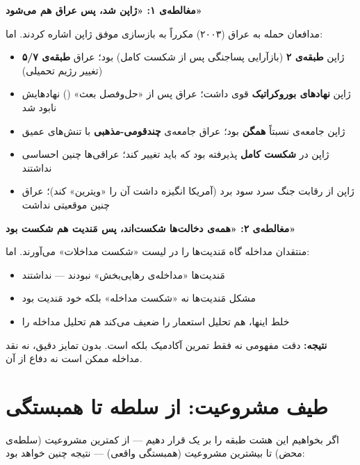 \begin{tcolorbox}[enemybox, title={خطر خلط طبقه‌ها: دو مغالطه‌ی رایج}]

\textbf{مغالطه‌ی ۱: «ژاپن شد، پس عراق هم می‌شود»}

مدافعان حمله به عراق (۲۰۰۳) مکرراً به بازسازی موفق ژاپن اشاره کردند.
اما:
\begin{itemize}
\item ژاپن \textbf{طبقه‌ی ۲} (بازآرایی پساجنگی پس از شکست کامل) بود؛
  عراق \textbf{طبقه‌ی ۵/۷} (تغییر رژیم تحمیلی)
\item ژاپن \textbf{نهادهای بوروکراتیک} قوی داشت؛ عراق پس از
  «حل‌وفصل بعث» () نهادهایش نابود شد
\item ژاپن جامعه‌ی نسبتاً \textbf{همگن} بود؛ عراق جامعه‌ی
  \textbf{چندقومی-مذهبی} با تنش‌های عمیق
\item ژاپن در \textbf{شکست کامل} پذیرفته بود که باید تغییر کند؛
  عراقی‌ها چنین احساسی نداشتند
\item ژاپن از رقابت جنگ سرد سود برد (آمریکا انگیزه داشت آن را
  «ویترین» کند)؛ عراق چنین موقعیتی نداشت
\end{itemize}

\tcblower

\textbf{مغالطه‌ی ۲: «همه‌ی دخالت‌ها شکست‌اند، پس مَندیت هم شکست بود»}

منتقدان مداخله گاه مَندیت‌ها را در لیست «شکست مداخلات» می‌آورند. اما:
\begin{itemize}
\item مَندیت‌ها «مداخله‌ی رهایی‌بخش» نبودند — 
  نداشتند
\item مشکل مَندیت‌ها نه «شکست مداخله» بلکه 
  خود مَندیت بود
\item خلط اینها، هم تحلیل استعمار را ضعیف می‌کند هم تحلیل مداخله را
\end{itemize}

\textbf{نتیجه:} دقت مفهومی نه فقط تمرین آکادمیک بلکه
 است. بدون تمایز دقیق، نه نقد مداخله ممکن
است نه دفاع از آن.
\end{tcolorbox}


\section{طیف مشروعیت: از سلطه تا همبستگی}
\label{sec:tax-legitimacy-spectrum}

اگر بخواهیم این هشت طبقه را بر یک  قرار دهیم —
از کمترین مشروعیت (سلطه‌ی محض) تا بیشترین مشروعیت (همبستگی واقعی) — نتیجه
چنین خواهد بود:

